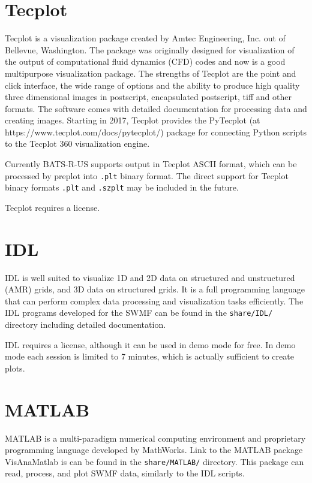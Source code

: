 \section{Tecplot}

Tecplot is a visualization package created by Amtec Engineering, Inc.
out of Bellevue, Washington.
The package was originally designed for visualization of the output of
computational fluid dynamics (CFD) codes and now is a good multipurpose
visualization package.  
The strengths of Tecplot are the point and click interface, the 
wide range of options and the ability to produce high quality
three dimensional images in postscript, encapsulated postscript, tiff
and other formats.
The software comes with detailed documentation for processing data and creating
images.
Starting in 2017, Tecplot provides the PyTecplot (at https://www.tecplot.com/docs/pytecplot/)
package for connecting Python scripts to the Tecplot 360 visualization engine.

Currently BATS-R-US supports output in Tecplot ASCII format, which can be
processed by preplot into \verb|.plt| binary format.
The direct support for Tecplot binary formats \verb|.plt| and \verb|.szplt|
may be included in the future.

Tecplot requires a license.

\section{IDL}

IDL is well suited to visualize 1D and 2D data on structured and unstructured
(AMR) grids, and 3D data on structured grids. 
It is a full programming language that can perform complex data processing and
visualization tasks efficiently.
The IDL programs developed for the SWMF can be found in the {\tt share/IDL/}
directory including detailed documentation.

IDL requires a license, although it can be used in demo mode for free.
In demo mode each session is limited to 7 minutes, which is actually 
sufficient to create plots.

\section{MATLAB}

MATLAB is a multi-paradigm numerical computing environment and proprietary
programming language developed by MathWorks.
Link to the MATLAB package VisAnaMatlab is can be found in the {\tt share/MATLAB/} directory.
This package can read, process, and plot SWMF data, similarly to the IDL scripts.

